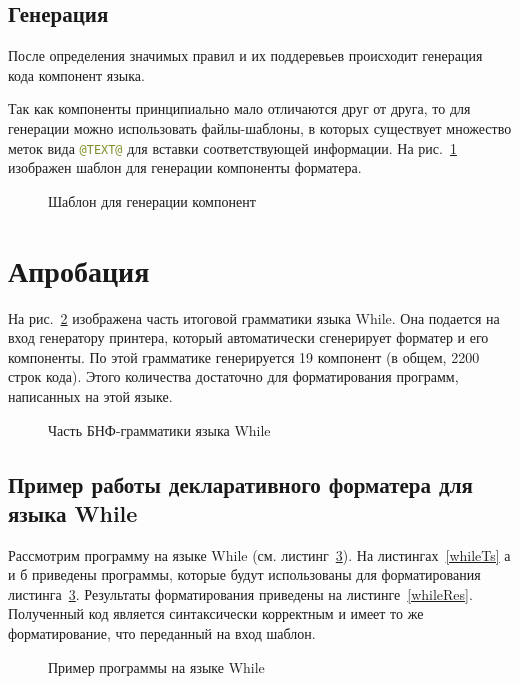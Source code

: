 \documentclass[conference]{IEEEtran}
\begin{document}
\subsection{Генерация}
После определения значимых правил и их поддеревьев происходит генерация кода компонент языка.

Так как компоненты принципиально мало отличаются друг от друга, то для генерации можно использовать файлы-шаблоны, в которых существует множество меток вида \lstinline[language=java]{@TEXT@} для вставки соответствующей информации.
На рис.~\ref{component} изображен шаблон для генерации компоненты форматера.
\begin{figure}[h]
	\centering
	
	\caption{Шаблон для генерации компонент}
	\label{component}
\end{figure}

\section{Апробация}
На рис.~\ref{whileBnf} изображена часть итоговой грамматики языка While.
Она подается на вход генератору принтера, который автоматически сгенерирует форматер и его компоненты.
По этой грамматике генерируется 19 компонент (в общем, 2200 строк кода).
Этого количества достаточно для форматирования программ, написанных на этой языке.

\begin{figure}[h]
	\centering
	
	\caption{Часть БНФ-грамматики языка While}
	\label{whileBnf}
\end{figure}

\subsection{Пример работы декларативного форматера для языка While}
Рассмотрим программу на языке While (см. листинг~\ref{whileProg}).
На листингах~\ref{whileTs} а и б приведены программы, которые будут использованы для форматирования листинга~\ref{whileProg}.
Результаты форматирования приведены на листинге~\ref{whileRes}.
Полученный код является синтаксически корректным и имеет то же форматирование, что переданный на вход шаблон.

\begin{figure}[h]
	\centering
	
	\caption{Пример программы на языке While}
	\label{whileProg}
\end{figure}
\end{document}
